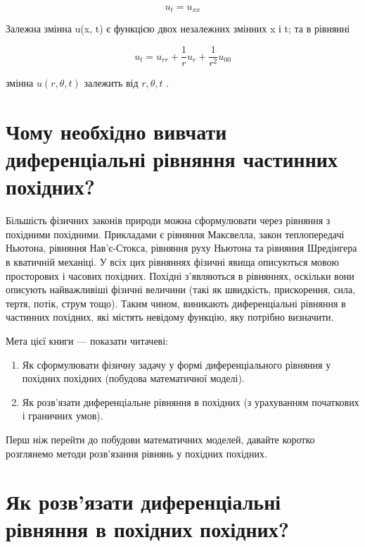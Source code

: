 \documentclass[
  ukrainian,
]{article}
\begin{document}
\[u_t = u_{xx}\]

Залежна змінна u(x, t) є функцією двох незалежних змінних x і t; та в
рівнянні

\[u_t = u_{rr} + \frac{1}{r} u_r + \frac{1}{r^2} u_{00}\]

змінна \(u(r, \theta, t)\) залежить від \(r, \theta, t\) .

\section{Чому необхідно вивчати диференціальні рівняння частинних
похідних?}\label{ux447ux43eux43cux443-ux43dux435ux43eux431ux445ux456ux434ux43dux43e-ux432ux438ux432ux447ux430ux442ux438-ux434ux438ux444ux435ux440ux435ux43dux446ux456ux430ux43bux44cux43dux456-ux440ux456ux432ux43dux44fux43dux43dux44f-ux447ux430ux441ux442ux438ux43dux43dux438ux445-ux43fux43eux445ux456ux434ux43dux438ux445}

Більшість фізичних законів природи можна сформулювати через рівняння з
похідними похідними. Прикладами є рівняння Максвелла, закон
теплопередачі Ньютона, рівняння Нав'є-Стокса, рівняння руху Ньютона та
рівняння Шредінгера в кватичній механіці. У всіх цих рівняннях фізичні
явища описуються мовою просторових і часових похідних. Похідні
з'являються в рівняннях, оскільки вони описують найважливіші фізичні
величини (такі як швидкість, прискорення, сила, тертя, потік, струм
тощо). Таким чином, виникають диференціальні рівняння в частинних
похідних, які містять невідому функцію, яку потрібно визначити.

Мета цієї книги --- показати читачеві:

\begin{enumerate}
\def\labelenumi{\arabic{enumi}.}
\item
  Як сформулювати фізичну задачу у формі диференціального рівняння у
  похідних похідних (побудова математичної моделі).
\item
  Як розв'язати диференціальне рівняння в похідних (з урахуванням
  початкових і граничних умов).
\end{enumerate}

Перш ніж перейти до побудови математичних моделей, давайте коротко
розглянемо методи розв'язання рівнянь у похідних похідних.

\section{Як розв'язати диференціальні рівняння в похідних
похідних?}\label{ux44fux43a-ux440ux43eux437ux432ux44fux437ux430ux442ux438-ux434ux438ux444ux435ux440ux435ux43dux446ux456ux430ux43bux44cux43dux456-ux440ux456ux432ux43dux44fux43dux43dux44f-ux432-ux43fux43eux445ux456ux434ux43dux438ux445-ux43fux43eux445ux456ux434ux43dux438ux445}
\end{document}
